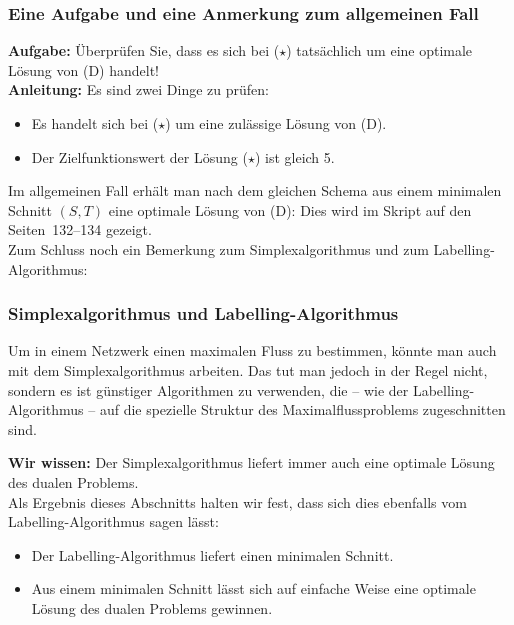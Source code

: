 \documentclass[smaller]{beamer}
\begin{document}
\begin{frame}
\frametitle{Eine Aufgabe und eine Anmerkung zum allgemeinen Fall}
\textbf{Aufgabe:} Überprüfen Sie, dass es sich bei ($\star$) tatsächlich um eine optimale
Lösung von (D) handelt! \\ \vspace*{0.2cm}
\textbf{Anleitung:} Es sind zwei Dinge zu prüfen:
\begin{itemize}
 \item Es handelt sich bei ($\star$) um eine zulässige Lösung von (D).
 \item Der Zielfunktionswert der Lösung ($\star$) ist gleich 5.
\end{itemize} \vspace*{0.2cm}
Im allgemeinen Fall erhält man nach dem gleichen Schema aus einem
minimalen Schnitt $(S, T)$ eine optimale Lösung von (D): Dies wird im Skript
auf den Seiten~132--134 gezeigt. \\ \vspace*{0.2cm} 
Zum Schluss noch ein Bemerkung zum Simplexalgorithmus und zum
Labelling-Algorithmus:
\end{frame}

\begin{frame}
\frametitle{Simplexalgorithmus und Labelling-Algorithmus}
Um in einem Netzwerk einen maximalen Fluss zu bestimmen, könnte man
auch mit dem Simplexalgorithmus arbeiten. Das tut man jedoch in der Regel
nicht, sondern es ist günstiger Algorithmen zu verwenden, die – wie der
Labelling-Algorithmus – auf die spezielle Struktur des
Maximalflussproblems zugeschnitten sind. \\ \vspace*{0.2cm}

\textbf{Wir wissen:} Der Simplexalgorithmus liefert immer auch eine optimale Lösung
des dualen Problems. \\ \vspace*{0.2cm}
Als Ergebnis dieses Abschnitts halten wir fest, dass sich dies ebenfalls vom
Labelling-Algorithmus sagen lässt:
\begin{itemize}
\item \alert{Der Labelling-Algorithmus liefert einen minimalen Schnitt.}
\item \alert{Aus einem minimalen Schnitt lässt sich auf einfache Weise eine optimale Lösung des dualen Problems gewinnen.}
\end{itemize}
\end{frame}
\end{document}
